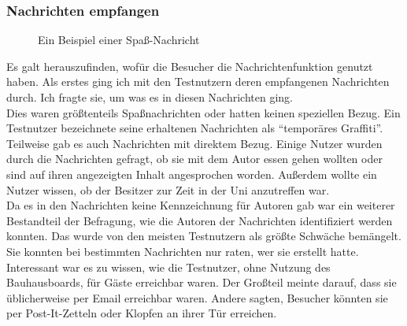 \subsubsection{Nachrichten empfangen}\label{Nachrichten Empfangen}
\begin{figure}[h!]
  \centering
  \caption{Ein Beispiel einer Spaß-Nachricht}
  \label{img:StudieExampleMessage}
\end{figure}
Es galt herauszufinden, wofür die Besucher die Nachrichtenfunktion genutzt haben.
Als erstes ging ich mit den Testnutzern deren empfangenen Nachrichten durch.
Ich fragte sie, um was es in diesen Nachrichten ging.
\\
Dies waren größtenteils Spaßnachrichten  oder hatten keinen speziellen Bezug. Ein Testnutzer bezeichnete seine erhaltenen Nachrichten als ``temporäres Graffiti''.
Teilweise gab es auch Nachrichten mit direktem Bezug.
Einige Nutzer wurden durch die Nachrichten gefragt, ob sie mit dem Autor essen gehen wollten oder sind auf ihren angezeigten Inhalt angesprochen worden.
Außerdem wollte ein Nutzer wissen, ob der Besitzer zur Zeit in der Uni anzutreffen war.
\\
Da es in den Nachrichten keine Kennzeichnung für Autoren gab war ein weiterer Bestandteil der Befragung, wie die Autoren der Nachrichten identifiziert werden konnten.
Das wurde von den meisten Testnutzern als größte Schwäche bemängelt.
Sie konnten bei bestimmten Nachrichten nur raten, wer sie erstellt hatte.
\\
Interessant war es zu wissen, wie die Testnutzer, ohne Nutzung des Bauhausboards, für Gäste erreichbar waren.
Der Großteil meinte darauf, dass sie üblicherweise per Email erreichbar waren.
Andere sagten, Besucher könnten sie per Post-It-Zetteln oder Klopfen an ihrer Tür erreichen.
